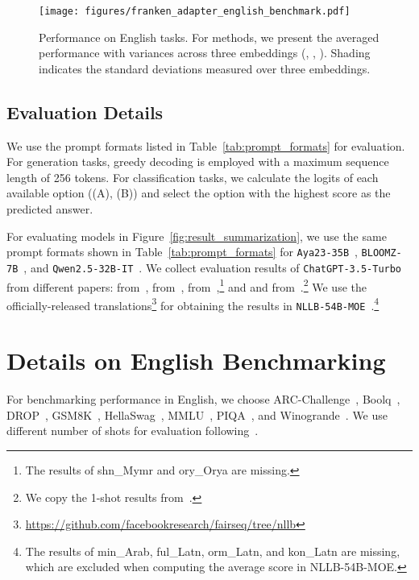 
\begin{figure*}[t]
    \setlength{\belowcaptionskip}{-0.35cm}
    \centering
    \texttt{[image: figures/franken\_adapter\_english\_benchmark.pdf]}
    \vspace{-6mm}
    \caption{Performance on English tasks. For \ouradapter methods, we present the averaged performance with variances across three embeddings (\ie \sea, \afr, \ind). Shading indicates the standard deviations measured over three embeddings.}
    \vspace{-4mm}
    \label{fig:franken_adapter_english_benchmark}
\end{figure*}

\subsection{Evaluation Details}\label{appendix:eval_details}
We use the prompt formats listed in Table~\ref{tab:prompt_formats} for evaluation. For generation tasks, greedy decoding is employed with a maximum sequence length of 256 tokens. For classification tasks, we calculate the logits of each available option (\eg (A), (B)) and select the option with the highest score as the predicted answer.

For evaluating models in Figure~\ref{fig:result_summarization}, we use the same prompt formats shown in Table~\ref{tab:prompt_formats} for \texttt{Aya23-35B}~\citep{aryabumi2024aya}, \texttt{BLOOMZ-7B}~\citep{muennighoff-etal-2023-crosslingual}, and \texttt{Qwen2.5-32B-IT}~\citep{yang2024qwen2technicalreport}. We collect evaluation results of \texttt{ChatGPT-3.5-Turbo} from different papers: \flores from~\citet{robinson-etal-2023-chatgpt}, \sib from~\citet{adelani-etal-2024-sib}, \belebele from~\citet{bandarkar-etal-2024-belebele},\footnote{The results of shn\_Mymr and ory\_Orya are missing.} and \xorqain and \xsumin from~\citet{singh-etal-2024-indicgenbench}.\footnote{We copy the 1-shot results from~\citet{singh-etal-2024-indicgenbench}.} We use the officially-released translations\footnote{\url{https://github.com/facebookresearch/fairseq/tree/nllb}} for obtaining the results in \texttt{NLLB-54B-MOE}~\citep{nllbteam2022languageleftbehindscaling}.\footnote{The results of min\_Arab, ful\_Latn, orm\_Latn, and kon\_Latn are missing, which are excluded when computing the average score in NLLB-54B-MOE.}

\section{Details on English Benchmarking}\label{appendix:english_tasks}
For benchmarking performance in English, we choose ARC-Challenge~\citep{clark2018thinksolvedquestionanswering}, Boolq~\citep{clark-etal-2019-boolq}, DROP~\citep{dua-etal-2019-drop}, GSM8K~\citep{cobbe2021trainingverifierssolvemath}, HellaSwag~\citep{zellers-etal-2019-hellaswag}, MMLU~\citep{hendrycks2021measuring}, PIQA~\citep{bisk2019piqa}, and Winogrande~\citep{winogrande}. We use different number of shots for evaluation following~\citet{team2024gemma}.

